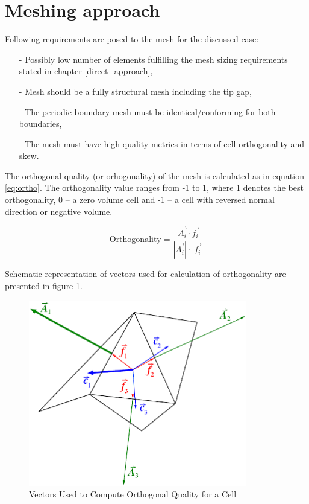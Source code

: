 \section{Meshing approach} \label{mesh}
Following requirements are posed to the mesh for the discussed case:
\begin{itemize}
\item[-]Possibly low number of elements fulfilling the mesh sizing requirements stated in chapter \ref{direct_approach},
\item[-] Mesh should be a fully structural mesh including the tip gap,
\item[-] The periodic boundary mesh must be identical/conforming for both boundaries,
\item[-] The mesh must have high quality metrics in terms of cell orthogonality and skew.
\end{itemize}

The orthogonal quality (or orhogonality) of the mesh is calculated as in equation \ref{eq:ortho}. The orthogonality value ranges from -1 to 1, where 1 denotes the best orthogonality, 0 -- a zero volume cell and -1 -- a cell with reversed normal direction or negative volume.

\begin{equation} \label{eq:ortho}
\text{Orthogonality} = \frac{\vec{A_i} \cdot \vec{f_i}}{|\vec{A_i}| \cdot |\vec{f_i}|}
\end{equation}

Schematic representation of vectors used for calculation of orthogonality are presented in figure \ref{ortho}.

\begin{figure}[ht!]
\centering %
\includegraphics[width=0.85\textwidth]{Pictures/Quality_Orthogonal_cell.png}
\caption{Vectors Used to Compute Orthogonal Quality for a Cell}
\label{ortho}
\end{figure}

